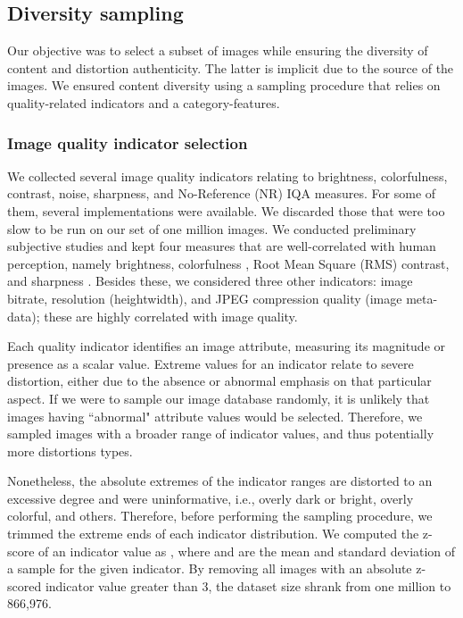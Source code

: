 \documentclass[10pt,journal,compsoc]{IEEEtran}
\begin{document}
\subsection{Diversity sampling}

Our objective was to select a subset of images while ensuring the diversity of content and distortion authenticity. The latter is implicit due to the source of the images. We ensured content diversity using a sampling procedure that relies on quality-related indicators and a category-features. 



\subsubsection{Image quality indicator selection}

We collected several image quality indicators relating to brightness, colorfulness, contrast, noise, sharpness, and No-Reference (NR) IQA measures. For some of them, several implementations were available. We discarded those that were too slow to be run on our set of one million images. We conducted preliminary subjective studies and kept four measures that are well-correlated with human perception, namely brightness, colorfulness \cite{Hasler:2003}, Root Mean Square (RMS) contrast, and sharpness \cite{Vu:2012}. Besides these, we considered three other indicators: image bitrate, resolution (heightwidth), and JPEG compression quality (image meta-data); these are highly correlated with image quality.

Each quality indicator identifies an image attribute, measuring its magnitude or presence as a scalar value. Extreme values for an indicator relate to severe distortion, either due to the absence or abnormal emphasis on that particular aspect. If we were to sample our image database randomly, it is unlikely that images having ``abnormal" attribute values would be selected. Therefore, we sampled images with a broader range of indicator values, and thus potentially more distortions types. 

Nonetheless, the absolute extremes of the indicator ranges are distorted to an excessive degree and were uninformative, i.e., overly dark or bright, overly colorful, and others. Therefore, before performing the sampling procedure, we trimmed the extreme ends of each indicator distribution. We computed the z-score of an indicator value  as , where  and  are the mean and standard deviation of a sample for the given indicator. By removing all images with an absolute z-scored indicator value greater than 3, the dataset size shrank from one million to 866,976.
\end{document}
